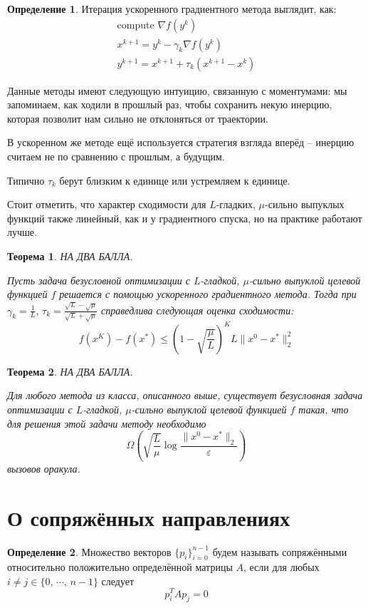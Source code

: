 \documentclass[a4paper,12pt]{article}
\renewcommand{\leq}{\ensuremath{\leqslant}}
\theoremstyle{plain}
\newtheorem{theorem}{Теорема}[section]
\theoremstyle{definition}
\newtheorem{definition}{Определение}[section]
\theoremstyle{remark}
\begin{document}
\begin{definition}
	Итерация ускоренного градиентного метода выглядит, как:
	\begin{align*}
		\text{compute }\nabla f(y^k)            \\
		x^{k + 1} = y^k - \gamma_k\nabla f(y^k) \\
		y^{k + 1} = x^{k + 1} + \tau_k(x^{k + 1} - x^k)
	\end{align*}
\end{definition}

Данные методы имеют следующую интуицию, связанную с моментумами: мы запоминаем, как ходили в прошлый раз, чтобы сохранить некую инерцию, которая позволит нам сильно не отклоняться от траектории.

В ускоренном же методе ещё используется стратегия взгляда вперёд -- инерцию считаем не по сравнению с прошлым, а будущим.

Типично $\tau_k$ берут близким к единице или устремляем к единице.

Стоит отметить, что характер сходимости для $L$-гладких, $\mu$-сильно выпуклых функций также линейный, как и у градиентного спуска, но на практике работают лучше.

\begin{theorem}
	НА ДВА БАЛЛА.

	Пусть задача безусловной оптимизации с $L$-гладкой, $\mu$-сильно выпуклой целевой функцией $f$ решается с помощью ускоренного градиентного метода. Тогда при $\gamma_k = \frac{1}{L},\, \tau_k = \frac{\sqrt{L} - \sqrt{\mu}}{\sqrt{L} + \sqrt{\mu}}$ справедлива следующая оценка сходимости:
	\[
		f(x^K) - f(x^*) \leq \left(1 - \sqrt{\frac{\mu}{L}}\right)^KL\|x^0 - x^*\|_2^2
	\]
\end{theorem}

\begin{theorem}
	НА ДВА БАЛЛА.

	Для любого метода из класса, описанного выше, существует безусловная задача оптимизации с $L$-гладкой, $\mu$-сильно выпуклой целевой функцией $f$ такая, что для решения этой задачи методу необходимо
	\[
		\Omega\left(\sqrt{\frac{L}{\mu}}\log\frac{\|x^0 - x^*\|_2}{\varepsilon}\right)
	\]
	вызовов оракула.
\end{theorem}

\section{О сопряжённых направлениях}
\begin{definition}
	Множество векторов $\{p_i\}_{i = 0}^{n - 1}$ будем называть сопряжёнными относительно положительно определённой матрицы $A$, если для любых $i \neq j \in \{0,\,\cdots,\,n-1\}$ следует
	\[
		p_i^TAp_j = 0
	\]
\end{definition}
\end{document}

